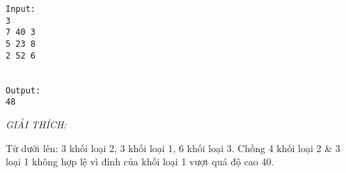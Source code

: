 \begin{verbatim}
Input:
3
7 40 3
5 23 8
2 52 6


Output:
48
\end{verbatim}

\emph{GIẢI THÍCH: }

Từ dưới lên: 3 khối loại 2, 3 khối loại 1, 6 khối loại 3. Chồng 4 khối loại 2 \& 3 loại 1 không hợp lệ vì đỉnh của khối loại 1 vượt quá độ cao 40.